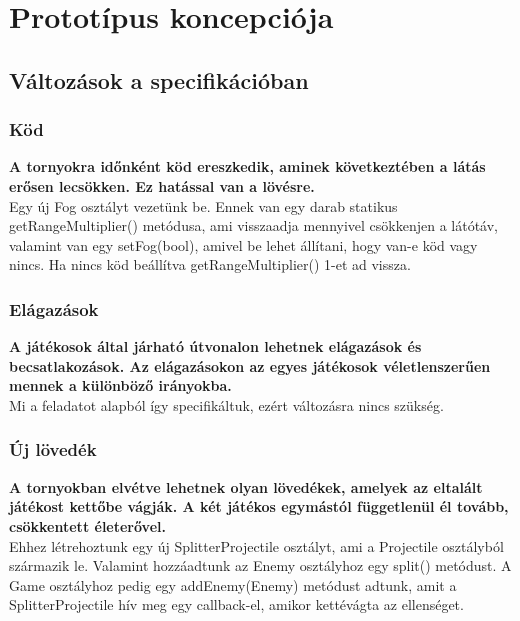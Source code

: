 %
\chapter{Prototípus koncepciója}

\thispagestyle{fancy}
\setcounter{section}{0}
\section{Változások a specifikációban}

\subsection{Köd}
\textbf{A tornyokra időnként köd ereszkedik, aminek következtében a látás erősen lecsökken. Ez hatással van a lövésre.}\\
Egy új Fog osztályt vezetünk be. Ennek van egy darab statikus getRangeMultiplier() metódusa, ami visszaadja mennyivel csökkenjen a látótáv, valamint van egy setFog(bool), amivel be lehet állítani, hogy van-e köd vagy nincs. Ha nincs köd beállítva getRangeMultiplier() 1-et ad vissza.

\subsection{Elágazások}
\textbf{A játékosok által járható útvonalon lehetnek elágazások és becsatlakozások. Az elágazásokon az egyes játékosok véletlenszerűen mennek a különböző irányokba.}\\
Mi a feladatot alapból így specifikáltuk, ezért változásra nincs szükség.
\subsection{Új lövedék}
\textbf{A tornyokban elvétve lehetnek olyan lövedékek, amelyek az eltalált játékost kettőbe vágják. A két játékos egymástól függetlenül él tovább, csökkentett életerővel.}\\
Ehhez létrehoztunk egy új SplitterProjectile osztályt, ami a Projectile osztályból származik le. Valamint hozzáadtunk az Enemy osztályhoz egy split() metódust. A Game osztályhoz pedig egy addEnemy(Enemy) metódust adtunk, amit a SplitterProjectile hív meg egy callback-el, amikor kettévágta az ellenséget.

